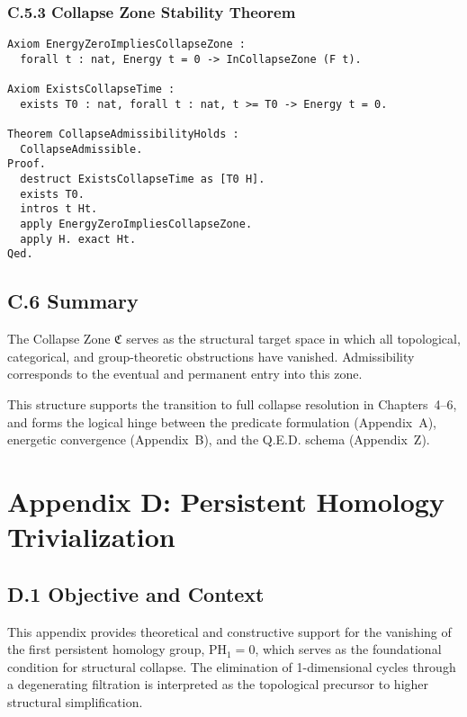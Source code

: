 \documentclass[11pt]{article}
\begin{document}
\subsubsection*{C.5.3 Collapse Zone Stability Theorem}

\begin{lstlisting}[language=Coq, caption=Stability of Collapse Zone Post T₀, captionpos=b]
Axiom EnergyZeroImpliesCollapseZone :
  forall t : nat, Energy t = 0 -> InCollapseZone (F t).

Axiom ExistsCollapseTime :
  exists T0 : nat, forall t : nat, t >= T0 -> Energy t = 0.

Theorem CollapseAdmissibilityHolds :
  CollapseAdmissible.
Proof.
  destruct ExistsCollapseTime as [T0 H].
  exists T0.
  intros t Ht.
  apply EnergyZeroImpliesCollapseZone.
  apply H. exact Ht.
Qed.
\end{lstlisting}

\subsection*{C.6 Summary}

The Collapse Zone \( \mathfrak{C} \) serves as the structural target space in which all topological, categorical, and group-theoretic obstructions have vanished. Admissibility corresponds to the eventual and permanent entry into this zone.

This structure supports the transition to full collapse resolution in Chapters~4–6, and forms the logical hinge between the predicate formulation (Appendix~A), energetic convergence (Appendix~B), and the Q.E.D. schema (Appendix~Z).



\appendix
\section*{Appendix D: Persistent Homology Trivialization}

\subsection*{D.1 Objective and Context}

This appendix provides theoretical and constructive support for the vanishing of the first persistent homology group, \( \mathrm{PH}_1 = 0 \), which serves as the foundational condition for structural collapse. The elimination of 1-dimensional cycles through a degenerating filtration is interpreted as the topological precursor to higher structural simplification.
\end{document}
